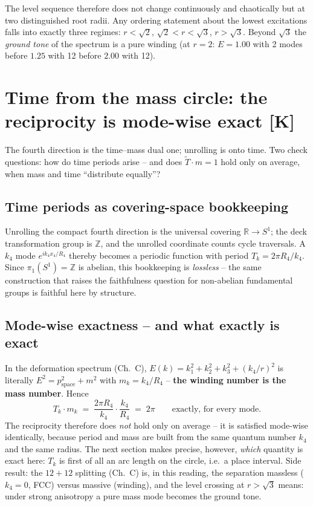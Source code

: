 \documentclass[11pt]{report}
\begin{document}
The level sequence therefore does not change continuously and
chaotically but at two distinguished root radii. Any ordering
statement about the lowest excitations falls into exactly three
regimes: $r < \sqrt2$, $\sqrt2 < r < \sqrt3$, $r > \sqrt3$. Beyond
$\sqrt3$ the \emph{ground tone} of the spectrum is a pure winding
(at $r = 2$: $E = 1.00$ with 2 modes before $1.25$ with 12 before
$2.00$ with 12).

\chapter{Time from the mass circle: the reciprocity is mode-wise exact [K]}

The fourth direction is the time--mass dual one; unrolling is onto
time. Two check questions: how do time periods arise -- and does
$\tilde T\cdot m = 1$ hold only on average, when mass and time
\enquote{distribute equally}?

\section{Time periods as covering-space bookkeeping}

Unrolling the compact fourth direction is the universal covering
$\mathbb{R}\to S^1$; the deck transformation group is
$\mathbb{Z}$, and the unrolled coordinate counts cycle
traversals. A $k_4$ mode $e^{ik_4x_4/R_4}$ thereby becomes a
periodic function with period $T_k = 2\pi R_4/k_4$. Since
$\pi_1(S^1) = \mathbb{Z}$ is abelian, this bookkeeping is
\emph{lossless} -- the same construction that raises the
faithfulness question for non-abelian fundamental groups is
faithful here by structure.

\section{Mode-wise exactness -- and what exactly is exact}

In the deformation spectrum (Ch.~C),
$E(k) = k_1^2+k_2^2+k_3^2 + (k_4/r)^2$ is literally
$E^2 = p_\text{space}^2 + m^2$ with $m_k = k_4/R_4$ --
\textbf{the winding number is the mass number}. Hence
\begin{equation}
  T_k \cdot m_k \;=\; \frac{2\pi R_4}{k_4}\cdot\frac{k_4}{R_4}
  \;=\; 2\pi
  \qquad\text{exactly, for every mode.}
\end{equation}
The reciprocity therefore does \emph{not} hold only on average --
it is satisfied mode-wise identically, because period and mass are
built from the same quantum number $k_4$ and the same radius. The
next section makes precise, however, \emph{which} quantity is exact
here: $T_k$ is first of all an arc length on the circle, i.e.\ a
place interval. Side
result: the $12+12$ splitting (Ch.~C) is, in this reading, the
separation massless ($k_4 = 0$, FCC) versus massive (winding), and
the level crossing at $r > \sqrt3$ means: under strong anisotropy
a pure mass mode becomes the ground tone.
\end{document}
